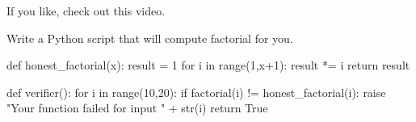 \documentclass{ximera}
\begin{document}
If you like, check out this video.


\begin{exploration}
Write a Python script that will compute factorial for you.
\begin{solution}
\begin{python}
def honest_factorial(x):
  result = 1
  for i in range(1,x+1):
    result *= i
  return result

def verifier():
  for i in range(10,20):
    if factorial(i) != honest_factorial(i):
      raise "Your function failed for input " + str(i)
  return True
\end{python}
\end{solution}
\end{exploration}
\end{document}
